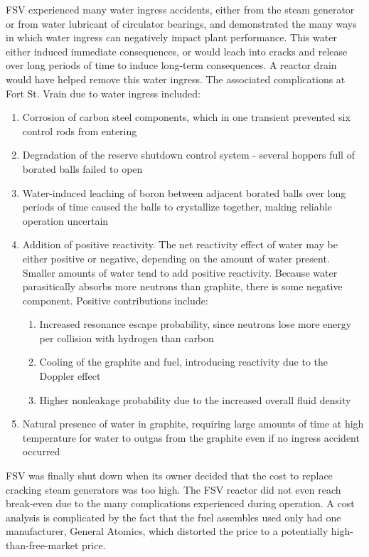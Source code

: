\documentclass[10pt]{article}
\numberwithin{equation}{section} %
\begin{document}
FSV experienced many water ingress accidents, either from the steam generator or from water lubricant of circulator bearings, and demonstrated the many ways in which water ingress can negatively impact plant performance. This water either induced immediate consequences, or would leach into cracks and release over long periods of time to induce long-term consequences. A reactor drain would have helped remove this water ingress. The associated complications at Fort St. Vrain due to water ingress included:

\begin{enumerate}
\item Corrosion of carbon steel components, which in one transient prevented six control rods from entering
\item Degradation of the reserve shutdown control system - several hoppers full of borated balls failed to open
\item Water-induced leaching of boron between adjacent borated balls over long periods of time caused the balls to crystallize together, making reliable operation uncertain
\item Addition of positive reactivity. The net reactivity effect of water may be either positive or negative, depending on the amount of water present. Smaller amounts of water tend to add positive reactivity. Because water parasitically absorbs more neutrons than graphite, there is some negative component. Positive contributions include:
	\begin{enumerate}
		\item Increased resonance escape probability, since neutrons lose more energy per collision with hydrogen than carbon
		\item Cooling of the graphite and fuel, introducing reactivity due to the Doppler effect
		\item Higher nonleakage probability due to the increased overall fluid density
	\end{enumerate}
\item Natural presence of water in graphite, requiring large amounts of time at high temperature for water to outgas from the graphite even if no ingress accident occurred
\end{enumerate}

FSV was finally shut down when its owner decided that the cost to replace cracking steam generators was too high. The FSV reactor did not even reach break-even due to the many complications experienced during operation. A cost analysis is complicated by the fact that the fuel assembles used only had one manufacturer, General Atomics, which distorted the price to a potentially high-than-free-market price.
\end{document}
